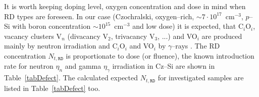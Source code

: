 \documentclass[aip,jap, amsmath,amssymb,reprint]{revtex4-1}
\begin{document}
It is worth keeping doping level, oxygen concentration and dose in mind when RD types are foreseen.
In our case (Czochralski, oxygen--rich, $\sim7\cdot10^{17}$~cm$^{-3}$, $p$--Si with boron concentration $\sim10^{15}$~cm$^{-3}$ and low dose)
it is expected, that C$_i$O$_i$, vacancy clusters V$_n$ (divacancy V$_2$, trivacancy V$_3$, ...) and VO$_i$
are produced mainly by neutron irradiation \cite{n:long,n:gamma,Moll:PhD}
and C$_i$O$_i$ and  VO$_i$ by $\gamma$--rays \cite{gamma:Stahl,Moll:PhD,gamma:Kolk,A:Caracas}.
The RD concentration $N_{t,\mathtt{RD}}$ is proportionate to dose (or fluence),
the known introduction rate for neutron $\eta_n$ and gamma $\eta_\gamma$ irradiation in Cz--Si are shown in Table~\ref{tabDefect}.
The calculated expected $N_{t,\mathtt{RD}}$ for investigated samples are listed in Table~\ref{tabDefect} too.

\end{document}
